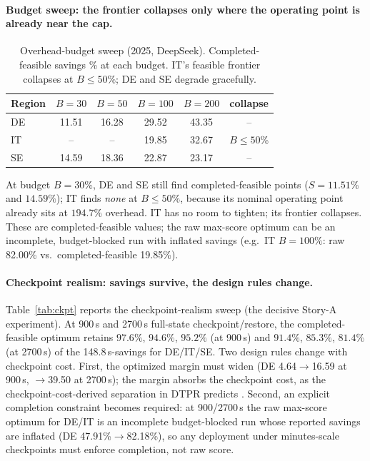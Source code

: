 \documentclass[sigconf,nonacm=false]{acmart}
\begin{document}
\paragraph{Budget sweep: the frontier collapses only where the operating point
is already near the cap.}
\begin{table}[t]
  \caption{Overhead-budget sweep (2025, DeepSeek). Completed-feasible savings
  \% at each budget. IT's feasible frontier collapses at $B\le50\%$; DE and SE
  degrade gracefully.}
  \label{tab:budget}
  \small
  \begin{tabular}{@{}l c c c c c@{}}
    \toprule
    Region & $B{=}30$ & $B{=}50$ & $B{=}100$ & $B{=}200$ & collapse \\
    \midrule
    DE & 11.51 & 16.28 & 29.52 & 43.35 & -- \\
    IT & -- & -- & 19.85 & 32.67 & $B \le 50$\% \\
    SE & 14.59 & 18.36 & 22.87 & 23.17 & -- \\
    \bottomrule
  \end{tabular}
\end{table}
At budget $B{=}30\%$, DE and SE still find completed-feasible points
($S{=}11.51\%$ and $14.59\%$); IT finds \emph{none} at $B\le50\%$, because its
nominal operating point already sits at $194.7\%$ overhead. IT has no room to
tighten; its frontier collapses. These are completed-feasible values; the raw
max-score optimum can be an incomplete, budget-blocked run with inflated
savings (e.g.\ IT $B{=}100\%$: raw 82.00\% vs.\ completed-feasible 19.85\%).

\paragraph{Checkpoint realism: savings survive, the design rules change.}
\label{sec:ckpt}
Table~\ref{tab:ckpt} reports the checkpoint-realism sweep (the decisive Story-A
experiment). At 900\,s and 2700\,s full-state checkpoint/restore, the
completed-feasible optimum retains $97.6\%$, $94.6\%$, $95.2\%$ (at 900\,s) and
$91.4\%$, $85.3\%$, $81.4\%$ (at 2700\,s) of the 148.8\,s-savings for DE/IT/SE.
Two design rules change with checkpoint cost.
First, the optimized margin must widen (DE 4.64$\to$16.59 at 900\,s,
$\to$39.50 at 2700\,s); the margin absorbs the checkpoint cost, as the
checkpoint-cost-derived separation in DTPR predicts \cite{lechowicz2023opr}.
Second, an explicit completion constraint becomes required: at 900/2700\,s the
raw max-score optimum for DE/IT is an incomplete budget-blocked run whose
reported savings are inflated (DE 47.91\%$\to$82.18\%), so any deployment under
minutes-scale checkpoints must enforce completion, not raw score.
\end{document}
